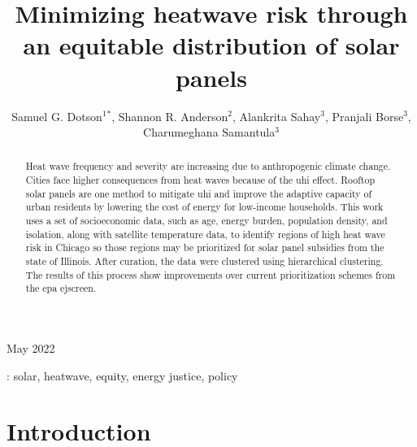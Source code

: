 \documentclass[10pt]{iopart}
\begin{document}
\title[Minimizing heatwave risk through an equitable distribution of solar panels]{Minimizing
heatwave risk through an equitable distribution of solar panels}

 \author{
 Samuel G. Dotson$^1$$^*$,
 Shannon R. Anderson$^2$,
 Alankrita Sahay$^3$,
 Pranjali Borse$^3$,
 Charumeghana Samantula$^3$
 }

 \address{ $^1$ Department of Nuclear, Plasma, and Radiological Engineering,
 University of Illinois Urbana-Champaign, Urbana IL, United States}
  \address{ $^2$ Department of  Natural Resources and Environmental Sciences,
 University of Illinois Urbana-Champaign, Urbana IL, United States}
  \address{ $^3$ Department of Civil and Environmental Engineering,
 University of Illinois Urbana-Champaign, Urbana IL, United States}
 \address{$^*$ Author to whom correspondence should be addressed}


 \begin{indented}
 \vspace{10pt}
 \item[]May 2022
 \end{indented}

 \begin{abstract}
Heat wave frequency and severity are increasing due to anthropogenic climate change.
Cities face higher consequences from heat waves because of the \ac{uhi} effect.
Rooftop solar panels are one method to mitigate \ac{uhi} and improve the adaptive
capacity of urban residents by lowering the cost of energy for low-income households.
This work uses a set of socioeconomic data, such as age, energy burden, population
density, and isolation, along with satellite temperature data, to identify regions
of high heat wave risk in Chicago so those regions may be prioritized for solar
panel subsidies from the state of Illinois. After curation, the data were clustered
using hierarchical clustering. The results of this process show improvements over
current prioritization schemes from the \ac{epa} \ac{ejscreen}. 
 \end{abstract}

 \vspace{2pc}
: solar, heatwave, equity, energy justice, policy

\acresetall

\section{Introduction}

\end{document}
